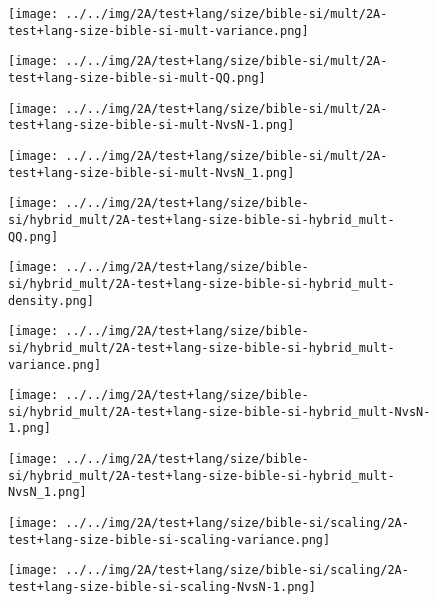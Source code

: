 \begin{figure}[H]
\centering	\texttt{[image: ../../img/2A/test+lang/size/bible-si/mult/2A-test+lang-size-bible-si-mult-variance.png]}
\end{figure}
\begin{figure}[H]
\centering	\texttt{[image: ../../img/2A/test+lang/size/bible-si/mult/2A-test+lang-size-bible-si-mult-QQ.png]}
\end{figure}
\begin{figure}[H]
\centering	\texttt{[image: ../../img/2A/test+lang/size/bible-si/mult/2A-test+lang-size-bible-si-mult-NvsN-1.png]}
\end{figure}
\begin{figure}[H]
\centering	\texttt{[image: ../../img/2A/test+lang/size/bible-si/mult/2A-test+lang-size-bible-si-mult-NvsN\_1.png]}
\end{figure}
\begin{figure}[H]
\centering	\texttt{[image: ../../img/2A/test+lang/size/bible-si/hybrid\_mult/2A-test+lang-size-bible-si-hybrid\_mult-QQ.png]}
\end{figure}
\begin{figure}[H]
\centering	\texttt{[image: ../../img/2A/test+lang/size/bible-si/hybrid\_mult/2A-test+lang-size-bible-si-hybrid\_mult-density.png]}
\end{figure}
\begin{figure}[H]
\centering	\texttt{[image: ../../img/2A/test+lang/size/bible-si/hybrid\_mult/2A-test+lang-size-bible-si-hybrid\_mult-variance.png]}
\end{figure}
\begin{figure}[H]
\centering	\texttt{[image: ../../img/2A/test+lang/size/bible-si/hybrid\_mult/2A-test+lang-size-bible-si-hybrid\_mult-NvsN-1.png]}
\end{figure}
\begin{figure}[H]
\centering	\texttt{[image: ../../img/2A/test+lang/size/bible-si/hybrid\_mult/2A-test+lang-size-bible-si-hybrid\_mult-NvsN\_1.png]}
\end{figure}
\begin{figure}[H]
\centering	\texttt{[image: ../../img/2A/test+lang/size/bible-si/scaling/2A-test+lang-size-bible-si-scaling-variance.png]}
\end{figure}
\begin{figure}[H]
\centering	\texttt{[image: ../../img/2A/test+lang/size/bible-si/scaling/2A-test+lang-size-bible-si-scaling-NvsN-1.png]}
\end{figure}
